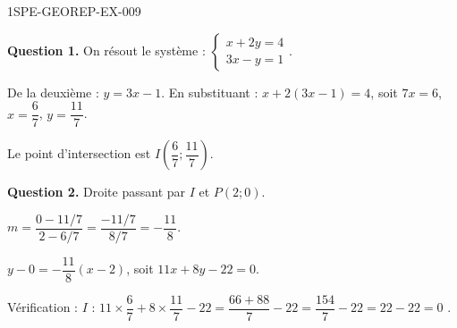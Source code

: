 \begin{corrige}{1SPE-GEOREP-EX-009}

\textbf{Question 1.} On résout le système :
$\begin{cases} x + 2y = 4 \\ 3x - y = 1 \end{cases}$.

De la deuxième : $y = 3x - 1$. En substituant : $x + 2(3x - 1) = 4$, soit $7x = 6$, $x = \dfrac{6}{7}$, $y = \dfrac{11}{7}$.

Le point d'intersection est $I\!\left(\dfrac{6}{7} ; \dfrac{11}{7}\right)$.

\textbf{Question 2.} Droite passant par $I$ et $P(2 ; 0)$.

$m = \dfrac{0 - 11/7}{2 - 6/7} = \dfrac{-11/7}{8/7} = -\dfrac{11}{8}$.

$y - 0 = -\dfrac{11}{8}(x - 2)$, soit $11x + 8y - 22 = 0$.

Vérification : $I$ : $11 \times \dfrac{6}{7} + 8 \times \dfrac{11}{7} - 22 = \dfrac{66 + 88}{7} - 22 = \dfrac{154}{7} - 22 = 22 - 22 = 0$ \checkmark.

\end{corrige}
